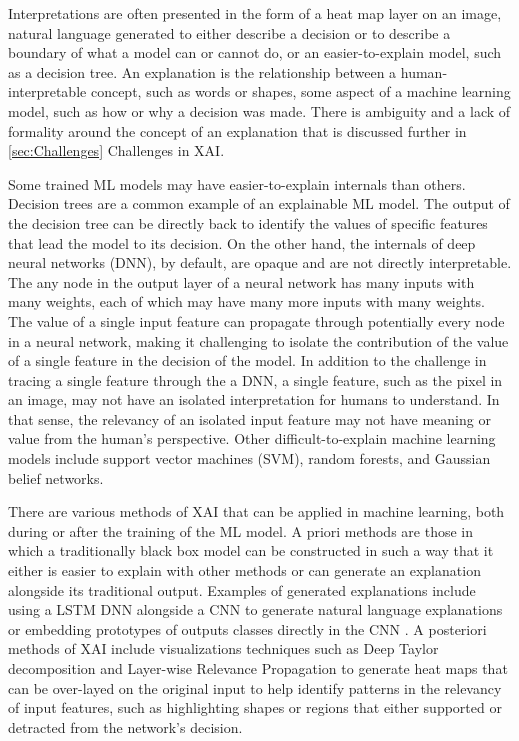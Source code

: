 \documentclass{IEEEtran}
\begin{document}
Interpretations are often presented in the form of a heat map layer on an image, natural language generated to either describe a decision or to describe a boundary of what a model can or cannot do, or an easier-to-explain model, such as a decision tree.  An explanation is the relationship between a human-interpretable concept, such as words or shapes, some aspect of a machine learning model, such as how or why a decision was made.  There is ambiguity and a lack of formality around the concept of an explanation that is discussed further in \ref{sec:Challenges} Challenges in XAI.

Some trained ML models may have easier-to-explain internals than others.  Decision trees are a common example of an explainable ML model.  The output of the decision tree can be directly back to identify the values of specific features that lead the model to its decision.  On the other hand, the internals of deep neural networks (DNN), by default, are opaque and are not directly interpretable.  The any node in the output layer of a neural network has many inputs with many weights, each of which may have many more inputs with many weights.  The value of a single input feature can propagate through potentially every node in a neural network, making it challenging to isolate the contribution of the value of a single feature in the decision of the model.  In addition to the challenge in tracing a single feature through the a DNN, a single feature, such as the pixel in an image, may not have an isolated interpretation for humans to understand.  In that sense, the relevancy of an isolated input feature may not have meaning or value from the human's perspective.  Other difficult-to-explain machine learning models include support vector machines (SVM), random forests, and Gaussian belief networks.

There are various methods of XAI that can be applied in machine learning, both during or after the training of the ML model.  A priori methods are those in which a traditionally black box model can be constructed in such a way that it either is easier to explain with other methods or can generate an explanation alongside its traditional output.  Examples of generated explanations include using a LSTM DNN alongside a CNN to generate natural language explanations \cite{10.1007/978-3-319-46493-0_1} or embedding prototypes of outputs classes directly in the CNN \cite{Chen2018}.  A posteriori methods of XAI include visualizations techniques such as Deep Taylor decomposition and Layer-wise Relevance Propagation to generate heat maps that can be over-layed on the original input to help identify patterns in the relevancy of input features, such as highlighting shapes or regions that either supported or detracted from the network's decision.
\end{document}
